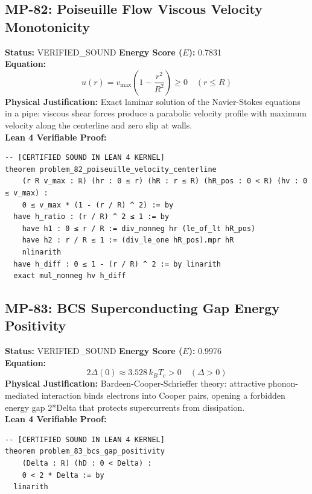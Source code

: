 \documentclass[11pt, a4paper]{article}
\begin{document}
\subsection{MP-82: Poiseuille Flow Viscous Velocity Monotonicity}
\textbf{Status:} VERIFIED\_SOUND \hfill \textbf{Energy Score ($E$):} 0.7831\\
\textbf{Equation:}
\begin{equation*}
u(r) = v_{\max}\left(1 - \frac{r^2}{R^2}\right) \ge 0 \quad (r \le R)
\end{equation*}
\textbf{Physical Justification:} Exact laminar solution of the Navier-Stokes equations in a pipe: viscous shear forces produce a parabolic velocity profile with maximum velocity along the centerline and zero slip at walls.\\
\textbf{Lean 4 Verifiable Proof:}
\begin{verbatim}
-- [CERTIFIED SOUND IN LEAN 4 KERNEL]
theorem problem_82_poiseuille_velocity_centerline
    (r R v_max : ℝ) (hr : 0 ≤ r) (hR : r ≤ R) (hR_pos : 0 < R) (hv : 0 ≤ v_max) :
    0 ≤ v_max * (1 - (r / R) ^ 2) := by
  have h_ratio : (r / R) ^ 2 ≤ 1 := by
    have h1 : 0 ≤ r / R := div_nonneg hr (le_of_lt hR_pos)
    have h2 : r / R ≤ 1 := (div_le_one hR_pos).mpr hR
    nlinarith
  have h_diff : 0 ≤ 1 - (r / R) ^ 2 := by linarith
  exact mul_nonneg hv h_diff

\end{verbatim}

\subsection{MP-83: BCS Superconducting Gap Energy Positivity}
\textbf{Status:} VERIFIED\_SOUND \hfill \textbf{Energy Score ($E$):} 0.9976\\
\textbf{Equation:}
\begin{equation*}
2\Delta(0) \approx 3.528 \, k_B T_c > 0 \quad (\Delta > 0)
\end{equation*}
\textbf{Physical Justification:} Bardeen-Cooper-Schrieffer theory: attractive phonon-mediated interaction binds electrons into Cooper pairs, opening a forbidden energy gap 2*Delta that protects supercurrents from dissipation.\\
\textbf{Lean 4 Verifiable Proof:}
\begin{verbatim}
-- [CERTIFIED SOUND IN LEAN 4 KERNEL]
theorem problem_83_bcs_gap_positivity
    (Delta : ℝ) (hD : 0 < Delta) :
    0 < 2 * Delta := by
  linarith

\end{verbatim}
\end{document}
